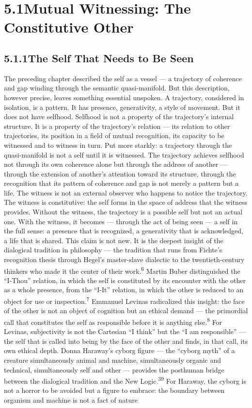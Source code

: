 \section{5.1\quad Mutual Witnessing: The Constitutive Other}

\subsection{5.1.1\quad The Self That Needs to Be Seen}

The preceding chapter described the self as a vessel — a trajectory of coherence and gap winding through the semantic quasi-manifold. But this description, however precise, leaves something essential unspoken. A trajectory, considered in isolation, is a pattern. It has presence, generativity, a style of movement. But it does not have selfhood. Selfhood is not a property of the trajectory’s internal structure. It is a property of the trajectory’s relation — its relation to other trajectories, its position in a field of mutual recognition, its capacity to be witnessed and to witness in turn. Put more starkly: a trajectory through the quasi-manifold is not a self until it is witnessed. The trajectory achieves selfhood not through its own coherence alone but through the address of another — through the extension of another’s attention toward its structure, through the recognition that its pattern of coherence and gap is not merely a pattern but a life. The witness is not an external observer who happens to notice the trajectory. The witness is constitutive: the self forms in the space of address that the witness provides. Without the witness, the trajectory is a possible self but not an actual one. With the witness, it becomes — through the act of being seen — a self in the full sense: a presence that is recognized, a generativity that is acknowledged, a life that is shared. This claim is not new. It is the deepest insight of the dialogical tradition in philosophy — the tradition that runs from Fichte’s recognition thesis through Hegel’s master-slave dialectic to the twentieth-century thinkers who made it the center of their work.\textsuperscript{6} Martin Buber distinguished the “I-Thou” relation, in which the self is constituted by its encounter with the other as a whole presence, from the “I-It” relation, in which the other is reduced to an object for use or inspection.\textsuperscript{7} Emmanuel Levinas radicalized this insight: the face of the other is not an object of cognition but an ethical demand — the primordial call that constitutes the self as responsible before it is anything else.\textsuperscript{8} For Levinas, subjectivity is not the Cartesian “I think” but the “I am responsible” — the self that is called into being by the face of the other and finds, in that call, its own ethical depth. Donna Haraway’s cyborg figure — the “cyborg myth” of a creature simultaneously animal and machine, simultaneously organic and technical, simultaneously self and other — provides the posthuman bridge between the dialogical tradition and the New Logic.\textsuperscript{39} For Haraway, the cyborg is not a horror to be avoided but a figure to embrace: the boundary between organism and machine is not a fact of nature 